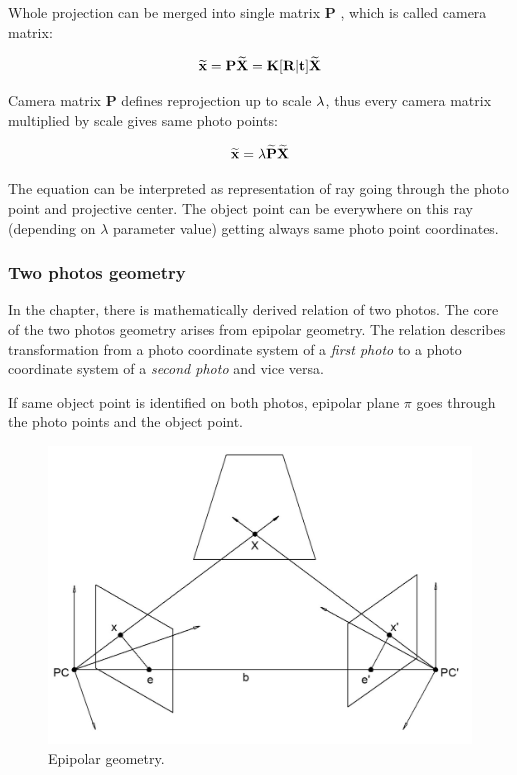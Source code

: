 \documentclass[a4paper,12pt]{article}
\newcommand{\ematr}[1]{
{\bf #1}
}
\newcommand{\evect}[1]{
{\bf #1}
}
\newcommand{\ehvect}[1]{
{\bf \widetilde{#1}}
}
\newcommand{\escal}[1]{
{\it #1}
}
\newcommand{\term}[1]{
{\it #1}%
}
\begin{document}
Whole projection can be merged into single matrix \ematr{P}, which is called camera matrix:

\begin{equation}
\label{eq:p_abbr}
\ehvect{x} =  \ematr{P} \ehvect{X} = \ematr{K} \ematr{[}\ematr{R}|\evect{t}\ematr{]} \ehvect{X}
\end{equation}

Camera matrix \ematr{P} defines reprojection up to scale $\escal{\lambda}$, thus every camera matrix multiplied by scale gives same photo points:

\begin{equation}
\ehvect{x}=\lambda\ehvect{P}\ehvect{X}
 \end{equation}

The equation can be interpreted as representation of ray going through the photo point and projective center. 
The object point can be everywhere on this ray (depending on $\lambda$ parameter value) getting always 
same photo point coordinates.

\subsubsection{Two photos geometry}



In the chapter, there is mathematically derived relation of two photos.
The core of the two photos geometry arises from epipolar geometry.
The relation describes transformation from a photo coordinate system of a \term{first photo} to 
a photo coordinate system of a \term{second photo} and vice versa.

If same object point is identified on both photos,  
epipolar plane $\pi$ goes through the photo points and the object point. 

\begin{figure}[h]
    \centering
    \includegraphics[scale=0.3]{figures/epipolar.png}
    \caption{Epipolar geometry.}
    \label{fig:epipolae}
\end{figure}
\end{document}
